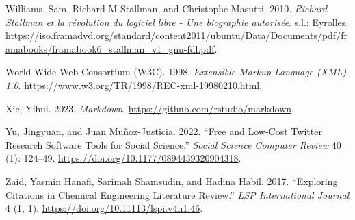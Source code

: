 \documentclass[
  letterpaper,
]{scrbook}
\newlength{\cslhangindent}
\newlength{\cslentryspacingunit} %
\newenvironment{CSLReferences}[2] %
 {%
  \setlength{\parindent}{0pt}
  \ifodd #1
  \let\oldpar\par
  \def\par{\hangindent=\cslhangindent\oldpar}
  \fi
  \setlength{\parskip}{#2\cslentryspacingunit}
 }%
 {}
\begin{document}
\begin{CSLReferences}{1}{0}
\leavevmode{}%
Williams, Sam, Richard M Stallman, and Christophe Masutti. 2010.
\emph{Richard Stallman et la révolution du logiciel libre - Une
biographie autorisée}. {s.l.}: {Eyrolles}.
\url{https://iso.framadvd.org/standard/content2011/ubuntu/Data/Documents/pdf/framabooks/framabook6_stallman_v1_gnu-fdl.pdf}.

\leavevmode{}%
World Wide Web Consortium (W3C). 1998. \emph{Extensible {Markup
Language} ({XML}) 1.0}.
\url{https://www.w3.org/TR/1998/REC-xml-19980210.html}.

\leavevmode{}%
Xie, Yihui. 2023. \emph{Markdown}.
\url{https://github.com/rstudio/markdown}.

\leavevmode{}%
Yu, Jingyuan, and Juan Muñoz-Justicia. 2022. {``Free and {Low-Cost
Twitter Research Software Tools} for {Social Science}.''} \emph{Social
Science Computer Review} 40 (1): 124--49.
\url{https://doi.org/10.1177/0894439320904318}.

\leavevmode{}%
Zaid, Yasmin Hanafi, Sarimah Shamsudin, and Hadina Habil. 2017.
{``Exploring {Citations} in {Chemical Engineering Literature Review}.''}
\emph{LSP International Journal} 4 (1, 1).
\url{https://doi.org/10.11113/lspi.v4n1.46}.

\end{CSLReferences}


\backmatter
\end{document}
